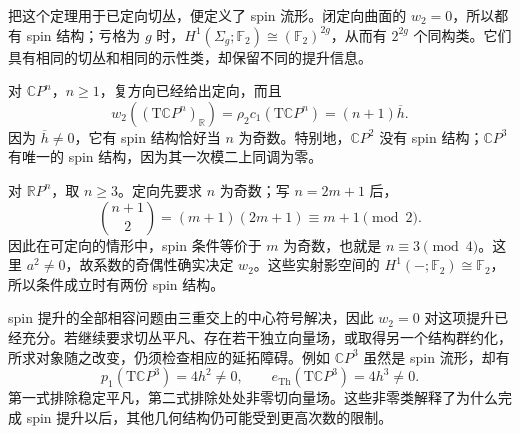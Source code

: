 把这个定理用于已定向切丛，便定义了 spin 流形。闭定向曲面的 \(w_2=0\)，所以都有 spin 结构；亏格为 \(g\) 时，\(H^1(\Sigma_g;\mathbb F_2)\cong(\mathbb F_2)^{2g}\)，从而有 \(2^{2g}\) 个同构类。它们具有相同的切丛和相同的示性类，却保留不同的提升信息。

\begin{example}\label{g2:exm:projective-spin-tests}
	对 \(\mathbb CP^n\)，\(n\ge1\)，复方向已经给出定向，而且
	\[
		w_2((\mathrm T\mathbb CP^n)_{\mathbb R})=\rho_2c_1(\mathrm T\mathbb CP^n)=(n+1)\overline h.
	\]
	因为 \(\overline h\ne0\)，它有 spin 结构恰好当 \(n\) 为奇数。特别地，\(\mathbb CP^2\) 没有 spin 结构；\(\mathbb CP^3\) 有唯一的 spin 结构，因为其一次模二上同调为零。

	对 \(\mathbb RP^n\)，取 \(n\ge3\)。定向先要求 \(n\) 为奇数；写 \(n=2m+1\) 后，
	\[
		\binom{n+1}{2}=(m+1)(2m+1)\equiv m+1\pmod2.
	\]
	因此在可定向的情形中，spin 条件等价于 \(m\) 为奇数，也就是 \(n\equiv3\pmod4\)。这里 \(a^2\ne0\)，故系数的奇偶性确实决定 \(w_2\)。这些实射影空间的 \(H^1(-;\mathbb F_2)\cong\mathbb F_2\)，所以条件成立时有两份 spin 结构。
\end{example}

spin 提升的全部相容问题由三重交上的中心符号解决，因此 \(w_2=0\) 对这项提升已经充分。若继续要求切丛平凡、存在若干独立向量场，或取得另一个结构群约化，所求对象随之改变，仍须检查相应的延拓障碍。例如 \(\mathbb CP^3\) 虽然是 spin 流形，却有
\[
	p_1(\mathrm T\mathbb CP^3)=4h^2\ne0,\qquad
	e_{\mathrm{Th}}(\mathrm T\mathbb CP^3)=4h^3\ne0.
\]
第一式排除稳定平凡，第二式排除处处非零切向量场。这些非零类解释了为什么完成 spin 提升以后，其他几何结构仍可能受到更高次数的限制。
